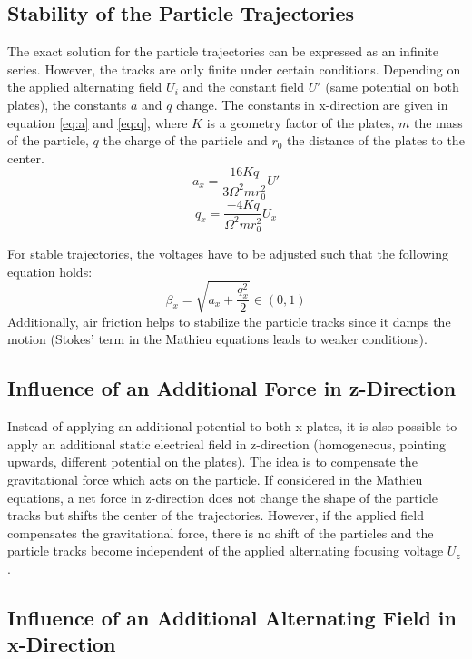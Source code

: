 \documentclass[
	paper=A4,
	parskip=full,
	chapterprefix=true,
	11pt,
	headings=normal,
	bibliography=totoc,
	listof=totoc,
	titlepage=on,
]{scrreprt}
\begin{document}
\subsection{Stability of the Particle Trajectories}
The exact solution for the particle trajectories can be expressed as an infinite series. However, the tracks are only finite under certain conditions. Depending on the applied alternating field $U_i$ and the constant field $U'$ (same potential on both plates), the constants $a$ and $q$ change. The constants in x-direction are given in equation \ref{eq:a} and \ref{eq:q}, where $K$ is a geometry factor of the plates, $m$ the mass of the particle, $q$ the charge of the particle and $r_0$ the distance of the plates to the center.
\begin{equation}
	\label{eq:a}
	a_x=\frac{16 K q}{3 \Omega^2 m r_0^2} U'
\end{equation}
\begin{equation}
	\label{eq:q}
	q_x= \frac{-4 K q}{ \Omega^2 m r_0^2} U_{x}
\end{equation}

For stable trajectories, the voltages have to be adjusted such that the following equation holds\cite{Lab_manual}:
\begin{equation}
 \beta_x  = \sqrt{a_x+\frac{q_x^2}{2}}  \in (0,1)
\end{equation}
Additionally, air friction helps to stabilize the particle tracks since it damps the motion (Stokes' term in the Mathieu equations leads to weaker conditions). 

\subsection{Influence of an Additional Force in z-Direction}
Instead of applying an additional potential to both x-plates, it is also possible to apply an additional static electrical field in z-direction (homogeneous, pointing upwards, different potential on the plates). The idea is to compensate the gravitational force which acts on the particle. If considered in the Mathieu equations, a net force in z-direction does not change the shape of the particle tracks but shifts the center of the trajectories. However, if the applied field compensates the gravitational force, there is no shift of the particles and the particle tracks become independent of the applied alternating focusing voltage $U_z$ \cite{Lab_manual}.

\subsection{Influence of an Additional Alternating Field in x-Direction}
\end{document}
